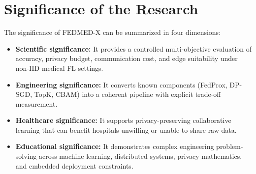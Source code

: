 \section{Significance of the Research}
The significance of FEDMED-X can be summarized in four dimensions:
\begin{itemize}[leftmargin=*]
  \item \textbf{Scientific significance:} It provides a controlled
        multi-objective evaluation of accuracy, privacy budget, communication
        cost, and edge suitability under non-IID medical FL settings.
  \item \textbf{Engineering significance:} It converts known components
        (FedProx, DP-SGD, TopK, CBAM) into a coherent pipeline with explicit
        trade-off measurement.
  \item \textbf{Healthcare significance:} It supports privacy-preserving
        collaborative learning that can benefit hospitals unwilling or unable
        to share raw data.
  \item \textbf{Educational significance:} It demonstrates complex engineering
        problem-solving across machine learning, distributed systems, privacy
        mathematics, and embedded deployment constraints.
\end{itemize}


